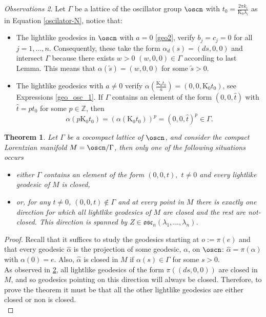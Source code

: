\documentclass[11pt]{amsart}
\theoremstyle{plain}
\newtheorem{thm}{Theorem}[section]
\theoremstyle{definition}
\theoremstyle{remark}
\newtheorem{obs}[thm]{Observations}
\begin{document}
\begin{obs}\label{obs-osc}
Let $\Gamma$ be a lattice of the oscillator group $\oscn$ with $t_0=\frac{2\pi k_i}{\mathrm{K_0} \lambda_i}$ as in Equation \eqref{oscilator-N}, notice that:
\begin{itemize}
    \item The lightlike geodesics in $\oscn$ with $a=0$ \eqref{geo2}, verify $b_j=c_j=0$ for all $j=1,...,n$. Consequently, these take the form $ \alpha_d(s)=(ds,0,0)$ and intersect $\Gamma$ because there exists $w > 0$ $(w,0,0) \in \Gamma$ according to last Lemma. This means that  $\alpha(\tilde{s})=(w,0,0)$ for some $\tilde{s} > 0$.
    \item The lightlike geodesics with $a \neq 0$ verify $\alpha(\frac{\mathrm{K_0} t_0}{a}) = (0,0,\mathrm{K_0} t_0)$, see Expressions \eqref{geo_osc_1}. If $\Gamma$ contains an element of the form $(0,0,\hat{t})$ with $\hat{t}=p t_0$ for some $p \in \mathbb{Z}$, then $$\alpha(p \mathrm{K_0} t_0) = (\alpha(\mathrm{K_0} t_0))^p = (0,0,\hat{t})^p \in \Gamma.$$ 
\end{itemize}


\begin{thm}\label{teoremaoscilador}
	Let $\Gamma$ be a cocompact lattice of $\oscn$, and consider the compact Lorentzian manifold $M=\oscn/\Gamma$, then only one of the following situations occurs
	\begin{itemize}
		\item either $\Gamma$ contains an element of the form $(0,0,t),$ $t \neq 0$ and every lightlike geodesic of $M$ is closed,
		\item or, for any $t \neq 0$, $(0,0,t) \notin \Gamma$ and at every point in $M$ there is exactly one direction for which all lightlike geodesics of $M$ are closed and the rest are not-closed. This direction is spanned by $Z \in \mathfrak{osc}_n(\lambda_1, ..., \lambda_n)$.		
	\end{itemize}
	
\end{thm}

\begin{proof}
	Recall that it suffices to study the geodesics starting at $o:=\pi(e)$ and that every geodesic $\hat{\alpha}$ is the projection of some geodesic, $\alpha$, on $\oscn$: $\hat{\alpha}=\pi(\alpha)$ with $\alpha(0)=e$. Also, $\hat{\alpha}$ is closed in $M$ if $\alpha(s) \in \Gamma$ for some $s>0$.\\
	
	As observed in \ref{obs-osc}, all lightlike geodesics of the form $\pi((ds,0,0))$ are closed in $M$, and so geodesics pointing on this direction will always be closed. Therefore, to prove the theorem it must be that all the other lightlike geodesics are either closed or non is closed.\\
	

\end{proof}
\end{obs}
\end{document}
